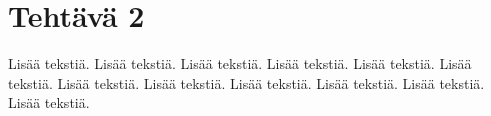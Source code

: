 
\chapter{Tehtävä 2 \label{chap:Teht=0000E4v=0000E4-2}}

Lisää tekstiä. Lisää tekstiä. Lisää
tekstiä. Lisää tekstiä. Lisää tekstiä.
Lisää tekstiä. Lisää tekstiä. Lisää
tekstiä. Lisää tekstiä. Lisää tekstiä.
Lisää tekstiä. Lisää tekstiä.
